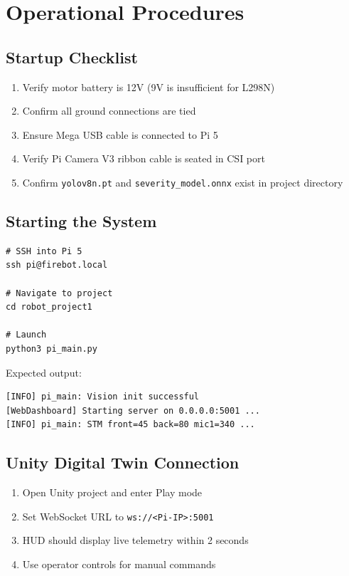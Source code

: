 \documentclass[11pt,a4paper]{article}
\begin{document}
\section{Operational Procedures}

\subsection{Startup Checklist}
\begin{enumerate}
    \item Verify motor battery is 12V (9V is insufficient for L298N)
    \item Confirm all ground connections are tied
    \item Ensure Mega USB cable is connected to Pi 5
    \item Verify Pi Camera V3 ribbon cable is seated in CSI port
    \item Confirm \texttt{yolov8n.pt} and \texttt{severity\_model.onnx} exist in project directory
\end{enumerate}

\subsection{Starting the System}
\begin{verbatim}
# SSH into Pi 5
ssh pi@firebot.local

# Navigate to project
cd robot_project1

# Launch
python3 pi_main.py
\end{verbatim}

Expected output:
\begin{verbatim}
[INFO] pi_main: Vision init successful
[WebDashboard] Starting server on 0.0.0.0:5001 ...
[INFO] pi_main: STM front=45 back=80 mic1=340 ...
\end{verbatim}

\subsection{Unity Digital Twin Connection}
\begin{enumerate}
    \item Open Unity project and enter Play mode
    \item Set WebSocket URL to \texttt{ws://<Pi-IP>:5001}
    \item HUD should display live telemetry within 2 seconds
    \item Use operator controls for manual commands
\end{enumerate}
\end{document}
